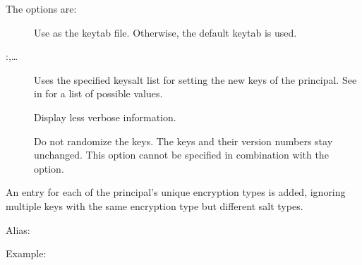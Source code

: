 \documentclass[letterpaper,10pt,english]{sphinxmanual}
\begin{document}
The options are:
\begin{description}
\item[{ }] \leavevmode
Use  as the keytab file.  Otherwise, the default keytab is
used.

\item[{ :,…}] \leavevmode
Uses the specified keysalt list for setting the new keys of the
principal.  See {\hyperref[\detokenize{admin/conf_files/kdc_conf:keysalt-lists}]{}} in {\hyperref[\detokenize{admin/conf_files/kdc_conf:kdc-conf-5}]{}} for a
list of possible values.

\item[{}] \leavevmode
Display less verbose information.

\item[{}] \leavevmode
Do not randomize the keys. The keys and their version numbers stay
unchanged.  This option cannot be specified in combination with the
 option.

\end{description}

An entry for each of the principal’s unique encryption types is added,
ignoring multiple keys with the same encryption type but different
salt types.

Alias: 

Example:

%
\begin{sphinxVerbatim}[commandchars=\\\{\}]
    
      
          
\end{sphinxVerbatim}
\end{document}
